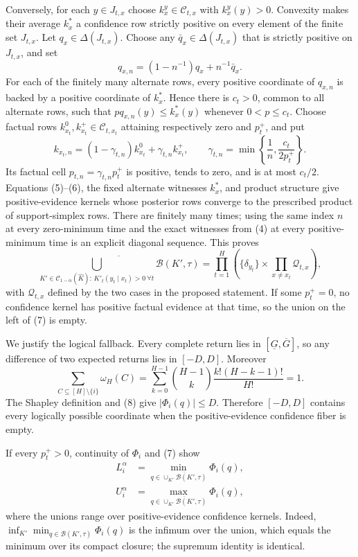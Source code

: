 Conversely, for each \(y\in J_{t,x}\) choose \(k_x^y\in\mathcal C_{t,x}\) with \(k_x^y(y)>0\).  Convexity makes their average \(k_x^*\) a confidence row strictly positive on every element of the finite set \(J_{t,x}\).  Let \(q_x\in\Delta(J_{t,x})\).  Choose any \(\bar q_x\in\Delta(J_{t,x})\) that is strictly positive on \(J_{t,x}\), and set
\[
 q_{x,n}=(1-n^{-1})q_x+n^{-1}\bar q_x. \tag{5}
\]
For each of the finitely many alternate rows, every positive coordinate of \(q_{x,n}\) is backed by a positive coordinate of \(k_x^*\).  Hence there is \(c_t>0\), common to all alternate rows, such that \(p q_{x,n}(y)\le k_x^*(y)\) whenever \(0<p\le c_t\).  Choose factual rows \(k_{x_t}^0,k_{x_t}^+\in\mathcal C_{t,x_t}\) attaining respectively zero and \(p_t^+\), and put
\[
 k_{x_t,n}=(1-\gamma_{t,n})k_{x_t}^0+\gamma_{t,n}k_{x_t}^+,
 \qquad
 \gamma_{t,n}=\min\left\{\frac1n,\frac{c_t}{2p_t^+}\right\}. \tag{6}
\]
Its factual cell \(p_{t,n}=\gamma_{t,n}p_t^+\) is positive, tends to zero, and is at most \(c_t/2\).  Equations (5)--(6), the fixed alternate witnesses \(k_x^*\), and product structure give positive-evidence kernels whose posterior rows converge to the prescribed product of support-simplex rows.  There are finitely many times; using the same index \(n\) at every zero-minimum time and the exact witnesses from (4) at every positive-minimum time is an explicit diagonal sequence.  This proves
\[
 \overline{\bigcup_{K'\in\mathcal C_{1-\alpha}(\widehat K):\,
 K'_t(y_t\mid x_t)>0\ \forall t}\mathcal B(K',\tau)}
 =\prod_{t=1}^H\left(
 \{\delta_{y_t}\}\times\prod_{x\ne x_t}\mathcal Q_{t,x}
 \right), \tag{7}
\]
with \(\mathcal Q_{t,x}\) defined by the two cases in the proposed statement.  If some \(p_t^+=0\), no confidence kernel has positive factual evidence at that time, so the union on the left of (7) is empty.

We justify the logical fallback.  Every complete return lies in \([\underline G,\overline G]\), so any difference of two expected returns lies in \([-D,D]\).  Moreover
\[
 \sum_{C\subseteq[H]\setminus\{i\}}\omega_H(C)
 =\sum_{k=0}^{H-1}{H-1\choose k}\frac{k!(H-k-1)!}{H!}=1. \tag{8}
\]
The Shapley definition and (8) give \(|\Phi_i(q)|\le D\).  Therefore \([-D,D]\) contains every logically possible coordinate when the positive-evidence confidence fiber is empty.

If every \(p_t^+>0\), continuity of \(\Phi_i\) and (7) show
\[
 \begin{aligned}
 L_i^\alpha
 &=\min_{q\in\overline{\cup_{K'}\mathcal B(K',\tau)}}\Phi_i(q),\\
 U_i^\alpha
 &=\max_{q\in\overline{\cup_{K'}\mathcal B(K',\tau)}}\Phi_i(q),
 \end{aligned} \tag{9}
\]
where the unions range over positive-evidence confidence kernels.  Indeed, \(\inf_{K'}\min_{q\in\mathcal B(K',\tau)}\Phi_i(q)\) is the infimum over the union, which equals the minimum over its compact closure; the supremum identity is identical.

